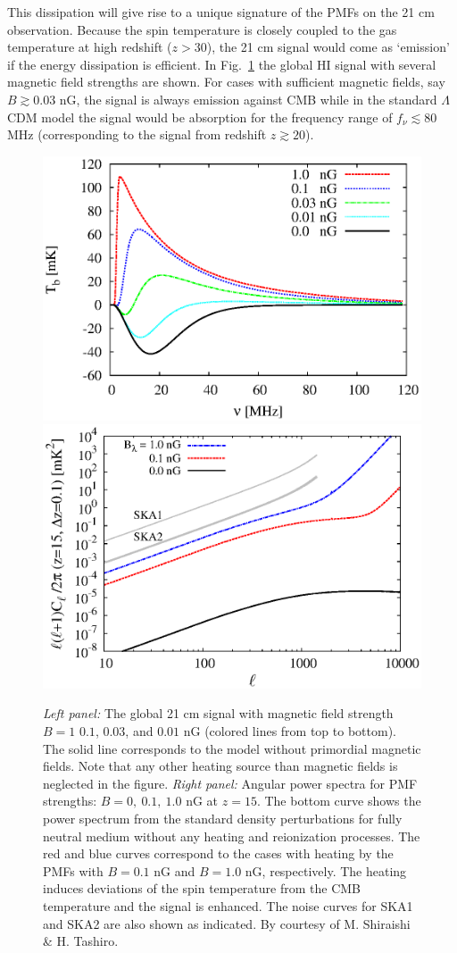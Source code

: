 \documentclass{PoS}
\begin{document}
This dissipation will give rise to a unique signature of the PMFs on the
21 cm observation. Because the spin temperature is closely coupled to
the gas temperature at high redshift ($z>30$), the 21 cm signal would
come as `emission' if the energy dissipation is efficient. In
Fig.~\ref{fig:KI1} the global HI signal with several magnetic field
strengths are shown. For cases with sufficient magnetic fields, say
$B\gtrsim 0.03$ nG, the signal is always emission against CMB while in
the standard $\Lambda$CDM model the signal would be absorption for the
frequency range of $f_\nu \lesssim 80$ MHz (corresponding to the signal
from redshift $z\gtrsim 20$).
\begin{figure}[]
\includegraphics[width=0.5\linewidth,angle=0]{figures/KI_fig1.eps}
\includegraphics[width=0.5\linewidth,angle=0]{figures/KI_fig2.eps}
\caption{{\em Left panel: }The global 21 cm signal with magnetic field strength $B=1$
$0.1$, $0.03$, and $0.01$ nG (colored lines from top to bottom). The
solid line corresponds to the model without primordial magnetic fields.
Note that any other heating source than magnetic fields is neglected in
the figure. {\em Right panel: }Angular power spectra for PMF strengths: $B=0,~ 0.1,~ 1.0$ nG
at $z=15$. The bottom curve shows the power spectrum from the standard
density perturbations for fully neutral medium without any heating and
reionization processes. The red and blue curves correspond to the cases
with heating by the PMFs with $B=0.1$ nG and $B=1.0$ nG,
respectively. The heating induces deviations of the spin temperature
from the CMB temperature and the signal is enhanced. The noise curves
for SKA1 and SKA2 are also shown as indicated. By courtesy of
M. Shiraishi \& H. Tashiro.}  \label{fig:KI1}
\end{figure}
\end{document}
